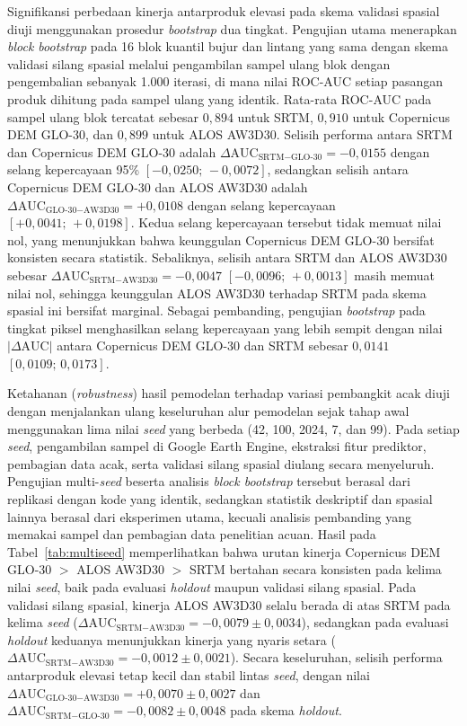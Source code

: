 \documentclass[12pt]{article}
\begin{document}
Signifikansi perbedaan kinerja antarproduk elevasi pada skema validasi spasial
diuji menggunakan prosedur \textit{bootstrap} dua tingkat. Pengujian utama
menerapkan \textit{block bootstrap} pada 16 blok kuantil bujur dan lintang
yang sama dengan skema validasi silang spasial melalui pengambilan sampel
ulang blok dengan pengembalian sebanyak 1.000 iterasi, di mana nilai ROC-AUC
setiap pasangan produk dihitung pada sampel ulang yang identik. Rata-rata
ROC-AUC pada sampel ulang blok tercatat sebesar $0{,}894$ untuk SRTM,
$0{,}910$ untuk Copernicus DEM GLO-30, dan $0{,}899$ untuk ALOS AW3D30.
Selisih performa antara SRTM dan Copernicus DEM GLO-30 adalah
$\Delta\text{AUC}_{\text{SRTM}-\text{GLO-30}} = -0{,}0155$ dengan selang
kepercayaan 95\% $[-0{,}0250;\,-0{,}0072]$, sedangkan selisih antara
Copernicus DEM GLO-30 dan ALOS AW3D30 adalah
$\Delta\text{AUC}_{\text{GLO-30}-\text{AW3D30}} = +0{,}0108$ dengan selang
kepercayaan $[+0{,}0041;\,+0{,}0198]$. Kedua selang kepercayaan tersebut tidak
memuat nilai nol, yang menunjukkan bahwa keunggulan Copernicus DEM GLO-30
bersifat konsisten secara statistik. Sebaliknya, selisih antara SRTM dan ALOS
AW3D30 sebesar $\Delta\text{AUC}_{\text{SRTM}-\text{AW3D30}} = -0{,}0047$
$[-0{,}0096;\,+0{,}0013]$ masih memuat nilai nol, sehingga keunggulan ALOS
AW3D30 terhadap SRTM pada skema spasial ini bersifat marginal. Sebagai
pembanding, pengujian \textit{bootstrap} pada tingkat piksel menghasilkan
selang kepercayaan yang lebih sempit dengan nilai $|\Delta\text{AUC}|$ antara
Copernicus DEM GLO-30 dan SRTM sebesar $0{,}0141$ $[0{,}0109;\,0{,}0173]$.

Ketahanan (\textit{robustness}) hasil pemodelan terhadap variasi pembangkit
acak diuji dengan menjalankan ulang keseluruhan alur pemodelan sejak tahap
awal menggunakan lima nilai \textit{seed} yang berbeda (42, 100, 2024, 7, dan
99). Pada setiap \textit{seed}, pengambilan sampel di Google Earth Engine,
ekstraksi fitur prediktor, pembagian data acak, serta validasi silang spasial
diulang secara menyeluruh. Pengujian multi-\textit{seed} beserta analisis
\textit{block bootstrap} tersebut berasal dari replikasi dengan kode yang
identik, sedangkan statistik deskriptif dan spasial lainnya berasal dari
eksperimen utama, kecuali analisis pembanding yang memakai sampel dan
pembagian data penelitian acuan. Hasil pada Tabel~\ref{tab:multiseed} memperlihatkan bahwa
urutan kinerja Copernicus DEM GLO-30 $>$ ALOS AW3D30 $>$ SRTM bertahan secara
konsisten pada kelima nilai \textit{seed}, baik pada evaluasi \textit{holdout}
maupun validasi silang spasial. Pada validasi silang spasial, kinerja ALOS
AW3D30 selalu berada di atas SRTM pada kelima \textit{seed}
($\Delta\text{AUC}_{\text{SRTM}-\text{AW3D30}} = -0{,}0079 \pm 0{,}0034$),
sedangkan pada evaluasi \textit{holdout} keduanya menunjukkan kinerja yang
nyaris setara ($\Delta\text{AUC}_{\text{SRTM}-\text{AW3D30}} = -0{,}0012 \pm
0{,}0021$). Secara keseluruhan, selisih performa antarproduk elevasi tetap
kecil dan stabil lintas \textit{seed}, dengan nilai
$\Delta\text{AUC}_{\text{GLO-30}-\text{AW3D30}} = +0{,}0070 \pm 0{,}0027$ dan
$\Delta\text{AUC}_{\text{SRTM}-\text{GLO-30}} = -0{,}0082 \pm 0{,}0048$ pada
skema \textit{holdout}.
\end{document}
